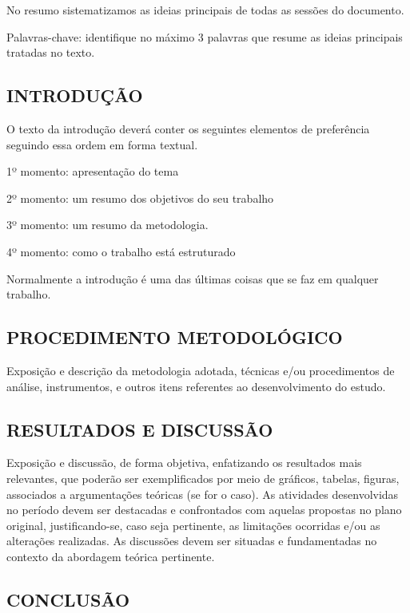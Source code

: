 \documentclass[
  brazilian,
  12pt,
]{article}
\begin{document}
No resumo sistematizamos as ideias principais de todas as sessões do
documento.

Palavras-chave: identifique no máximo 3 palavras que resume as ideias
principais tratadas no texto.

\subsection*{INTRODUÇÃO}\label{introduuxe7uxe3o}

O texto da introdução deverá conter os seguintes elementos de
preferência seguindo essa ordem em forma textual.

1º momento: apresentação do tema

2º momento: um resumo dos objetivos do seu trabalho

3º momento: um resumo da metodologia.

4º momento: como o trabalho está estruturado

Normalmente a introdução é uma das últimas coisas que se faz em qualquer
trabalho.

\subsection*{PROCEDIMENTO
METODOLÓGICO}\label{procedimento-metodoluxf3gico}

Exposição e descrição da metodologia adotada, técnicas e/ou
procedimentos de análise, instrumentos, e outros itens referentes ao
desenvolvimento do estudo.

\subsection*{RESULTADOS E DISCUSSÃO}\label{resultados-e-discussuxe3o}

Exposição e discussão, de forma objetiva, enfatizando os resultados mais
relevantes, que poderão ser exemplificados por meio de gráficos,
tabelas, figuras, associados a argumentações teóricas (se for o caso).
As atividades desenvolvidas no período devem ser destacadas e
confrontados com aquelas propostas no plano original, justificando-se,
caso seja pertinente, as limitações ocorridas e/ou as alterações
realizadas. As discussões devem ser situadas e fundamentadas no contexto
da abordagem teórica pertinente.

\subsection*{CONCLUSÃO}\label{conclusuxe3o}
\end{document}
